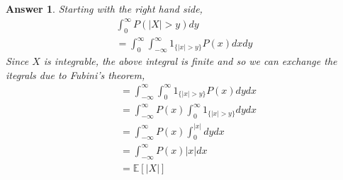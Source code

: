 \documentclass[12pt]{article}
\theoremstyle{colon}
\newtheorem*{answer}{Answer}
\begin{document}
\begin{answer}
  Starting with the right hand side,
  \begin{gather*}
    \int_0^\infty P( \lvert X \rvert > y) dy \\
    = \int_0^\infty \int_{-\infty}^\infty 1_{ \{ \lvert x \rvert > y \} } P(x) dx dy
  \end{gather*}
  Since $X$ is integrable, the above integral is finite and so we can exchange the itegrals due to Fubini's theorem,
  \begin{align*}
    &= \int_{-\infty}^\infty \int_0^\infty 1_{ \{ \lvert x \rvert > y \} } P(x) dy dx \\
    &= \int_{-\infty}^\infty P(x) \int_0^\infty 1_{ \{ \lvert x \rvert > y \} } dy dx \\
    &= \int_{-\infty}^\infty P(x) \int_0^{\lvert x \rvert } dy dx \\
    &= \int_{-\infty}^\infty P(x) \lvert x \rvert dx \\
    &= \mathbb{E}[ \lvert X \rvert ]
  \end{align*}
\end{answer}
\end{document}
